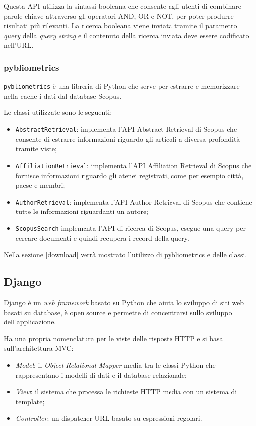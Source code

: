 Questa API utilizza la sintassi booleana che consente agli utenti di combinare parole chiave attraverso gli operatori AND, OR e NOT, per poter produrre risultati 
più rilevanti. La ricerca booleana viene inviata tramite il parametro \textit{query} della \textit{query string} e il contenuto della ricerca inviata deve essere 
codificato nell'URL.

\subsubsection{pybliometrics}
\texttt{pybliometrics} è una libreria di Python che serve per estrarre e memorizzare nella cache i dati dal database Scopus. 

Le classi utilizzate sono le seguenti:
\begin{itemize}
  \item \texttt{AbstractRetrieval}: implementa l'API Abstract Retrieval di Scopus che consente di estrarre informazioni riguardo gli articoli 
  a diversa profondità tramite viste;
  \item \texttt{AffiliationRetrieval}: implementa l'API Affiliation Retrieval di Scopus che fornisce informazioni riguardo gli atenei registrati, come per esempio 
  città, paese e membri;
  \item \texttt{AuthorRetrieval}: implementa l'API Author Retrieval di Scopus che contiene tutte le informazioni riguardanti un autore;
  \item \texttt{ScopusSearch} implementa l'API di ricerca di Scopus, esegue una query per cercare documenti e quindi recupera i record della query.
  \end {itemize}

Nella sezione \ref{download} verrà mostrato l'utilizzo di pybliometrics e delle classi.

\subsection{Django}

Django è un \textit{web framework} basato su Python che aiuta lo sviluppo di siti web basati su database, è open source e permette di 
concentrarsi sullo sviluppo dell'applicazione.

Ha una propria nomenclatura per le viste delle risposte HTTP e si basa sull'architettura MVC: 
\begin{itemize}
  \item \textit{Model}: il \textit{Object-Relational Mapper} media tra le classi Python che rappresentano i modelli di dati 
  e il database relazionale;
  \item \textit{View}: il sistema che processa le richieste HTTP media con un sistema di template;
  \item \textit{Controller}: un dispatcher URL basato su espressioni regolari.
\end{itemize}



